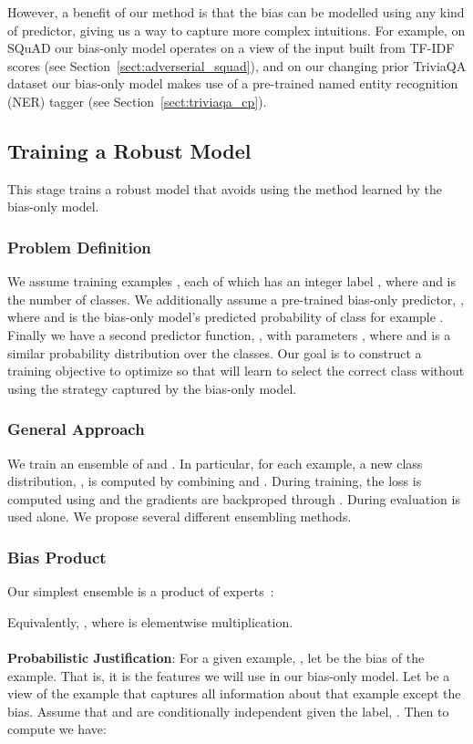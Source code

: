 \documentclass[11pt,a4paper]{article}
\begin{document}
However, a benefit of our method is that the bias can be modelled using any kind of predictor, giving us a way to capture more complex intuitions. 
For example, on SQuAD our bias-only model operates on a view of the input built from TF-IDF scores (see Section~\ref{sect:adverserial_squad}), and on our changing prior TriviaQA dataset our bias-only model makes use of a pre-trained named entity recognition (NER) tagger (see Section~\ref{sect:triviaqa_cp}).

\subsection{Training a Robust Model}
This stage trains a robust model that avoids using the method learned by the bias-only model.

\subsubsection{Problem Definition} We assume  training examples , each of which has an integer label , where  and  is the number of classes. 
We additionally assume a pre-trained bias-only predictor, , where  and  is the bias-only model's predicted probability of class  for example .
Finally we have a second predictor function, , with parameters , where  and  is a similar probability distribution over the classes.
Our goal is to construct a training objective to optimize  so that  will learn to select the correct class without using the strategy captured by the bias-only model. 

\subsubsection{General Approach} 
We train an ensemble of  and . 
In particular, for each example, a new class distribution, , is computed by combining  and . During training, the loss is computed using  and the gradients are backproped through . During evaluation  is used alone. We propose several different ensembling methods.

\subsubsection{Bias Product} 
 Our simplest ensemble is a product of experts~\cite{hinton1999products}:
 
 
 Equivalently, , where  is elementwise multiplication.
\\
\\ \noindent
\textbf{Probabilistic Justification}:
For a given example, , let  be the bias of the example. That is, it is the features we will use in our bias-only model. Let  be a view of the example that captures all information about that example except the bias. Assume that  and  are conditionally independent given the label, . Then to compute  we have:
\end{document}
